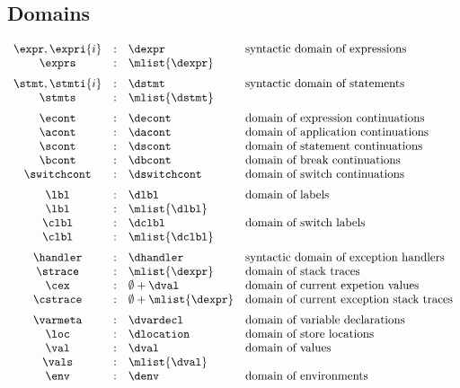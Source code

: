 \documentclass{article}
\begin{document}
\subsection{Domains}
\label{subsec:domains}
\[
  \begin{array}{ccll}
	\expr, \expri{i} & : & \dexpr & \textrm{syntactic domain of expressions}\\
	\exprs & : & \mlist{\dexpr}\\[2mm]

	\stmt, \stmti{i} & : & \dstmt & \textrm{syntactic domain of statements}\\
	\stmts & : & \mlist{\dstmt}  & \textrm{}\\[2mm]

	\econt & : & \decont & \textrm{domain of expression continuations}\\
	\acont & : & \dacont & \textrm{domain of application continuations}\\
	\scont & : & \dscont & \textrm{domain of statement continuations}\\
	\bcont & : & \dbcont & \textrm{domain of break continuations}\\
	\switchcont & : & \dswitchcont & \textrm{domain of switch continuations}\\[2mm]

	\lbl & : & \dlbl & \textrm{domain of labels}\\
	\lbl & : & \mlist{\dlbl} \\
	\clbl & : & \dclbl & \textrm{domain of switch labels}\\
	\clbl & : & \mlist{\dclbl} \\[2mm]

	\handler & : & \dhandler & \textrm{syntactic domain of exception handlers} \\
	\strace & : & \mlist{\dexpr} & \textrm{domain of stack traces}\\
	\cex & : &  \emptyset + \dval & \textrm{domain of current expetion values}\\
	\cstrace & : & \emptyset + \mlist{\dexpr} & \textrm{domain of current exception stack traces}\\[2mm]

	\varmeta & : & \dvardecl & \textrm{domain of variable declarations}\\
	\loc & : & \dlocation & \textrm{domain of store locations}\\
	\val & : & \dval & \textrm{domain of values}\\
	\vals & : & \mlist{\dval}\\
	\env & : & \denv & \textrm{domain of environments}\\[2mm]
  \end{array}
\]
\end{document}
